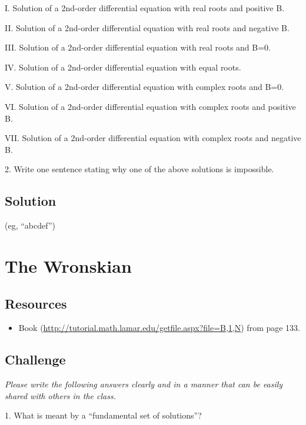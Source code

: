 I. Solution of a 2nd-order differential equation with real roots and positive B.

II. Solution of a 2nd-order differential equation with real roots and negative B.

III. Solution of a 2nd-order differential equation with real roots and B=0.

IV. Solution of a 2nd-order differential equation with equal roots.

V. Solution of a 2nd-order differential equation with complex roots and B=0.

VI. Solution of a 2nd-order differential equation with complex roots and positive B.

VII. Solution of a 2nd-order differential equation with complex roots and negative B.

\vspace{1em}
2. Write one sentence stating why one of the above solutions is impossible.

\subsection*{Solution}
(eg, ``abcdef'')


\timebox




\newpage
\section{The Wronskian}

\subsection*{Resources}
\begin{itemize}
    \item Book (\url{http://tutorial.math.lamar.edu/getfile.aspx?file=B,1,N}) from page 133.
\end{itemize}

\subsection*{Challenge}

\emph{Please write the following answers clearly and in a manner that can be easily shared with others in the class.}

1. What is meant by a ``fundamental set of solutions''?

